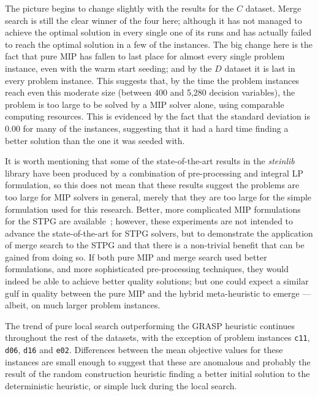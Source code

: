 \documentclass[journal]{IEEEtran}
\begin{document}
The picture begins to change slightly with the results for the \(C\) dataset. Merge search is still the clear winner of the four here; although it has not managed to achieve the optimal solution in every single one of its runs and has actually failed to reach the optimal solution in a few of the instances. The big change here is the fact that pure MIP has fallen to last place for almost every single problem instance, even with the warm start seeding; and by the \(D\) dataset it is last in every problem instance. This suggests that, by the time the problem instances reach even this moderate size (between 400 and 5,280 decision variables), the problem is too large to be solved by a MIP solver alone, using comparable computing resources. This is evidenced by the fact that the standard deviation is 0.00 for many of the instances, suggesting that it had a hard time finding a better solution than the one it was seeded with. 

It is worth mentioning that some of the state-of-the-art results in the \emph{steinlib} library have been produced by a combination of pre-processing and integral LP formulation, so this does not mean that these results suggest the problems are too large for MIP solvers in general, merely that they are too large for the simple formulation used for this research. Better, more complicated MIP formulations for the STPG are available~\cite{goemans,stpg-improved,hypergraph}; however, these experiments are not intended to advance the state-of-the-art for STPG solvers, but to demonstrate the application of merge search to the STPG and that there is a non-trivial benefit that can be gained from doing so. If both pure MIP and merge search used better formulations, and more sophisticated pre-processing techniques, they would indeed be able to achieve better quality solutions; but one could expect a similar gulf in quality between the pure MIP and the hybrid meta-heuristic to emerge --- albeit, on much larger problem instances.

The trend of pure local search outperforming the GRASP heuristic continues throughout the rest of the datasets, with the exception of problem instances \texttt{c11}, \texttt{d06}, \texttt{d16} and \texttt{e02}. Differences between the mean objective values for these instances are small enough to suggest that these are anomalous and probably the result of the random construction heuristic finding a better initial solution to the deterministic heuristic, or simple luck during the local search. 
\end{document}
